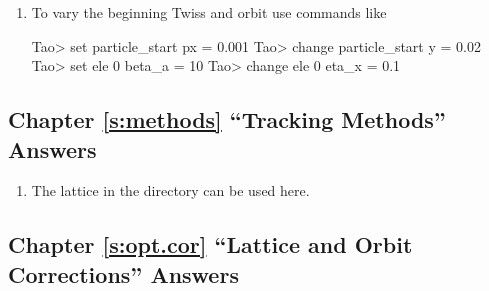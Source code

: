 \documentclass{hitec}     %
\begin{document}
\begin{enumerate}[label=\ref*{s:fork}.\arabic{enumi}]
\item
To vary the beginning Twiss and orbit use commands like
\begin{code}
Tao> set particle_start px = 0.001
Tao> change particle_start y = 0.02
Tao> set ele 0 beta_a = 10
Tao> change ele 0 eta_x = 0.1
\end{code}
\end{enumerate}

\subsection[Chapter \ref*{s:methods.ex} ``Tracking Methods'']{Chapter \hyperref[s:methods.ex]{\ref*{s:methods}} ``Tracking Methods'' Answers}
\label{s:ans.methods}

\begin{enumerate}[label=\ref*{s:methods}.\arabic{enumi}]
\item
The  lattice in the  directory can be used here.
\end{enumerate}

%

\subsection[Chapter \ref*{s:opt.corr.ex} ``Lattice Correction'']{Chapter \hyperref[s:opt.corr.ex]{\ref*{s:opt.cor}} ``Lattice and Orbit Corrections'' Answers}
\label{s:ans.corr}
\end{document}
